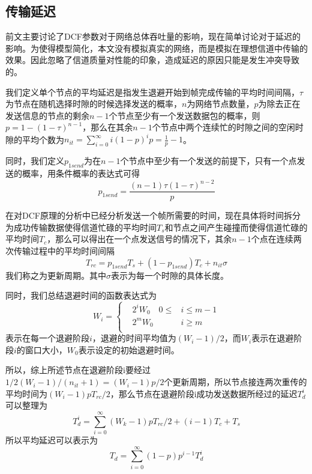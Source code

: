 \documentclass{article}
\begin{document}
\subsection{传输延迟}
前文主要讨论了DCF参数对于网络总体吞吐量的影响，现在简单讨论对于延迟的影响。为使得模型简化，本文没有模拟真实的网络，而是模拟在理想信道中传输的效果。因此忽略了信道质量对性能的印象，造成延迟的原因只能是发生冲突导致的。

我们定义单个节点的平均延迟是指发生退避开始到帧完成传输的平均时间间隔，$\tau$为节点在随机选择时隙的时候选择发送的概率，$n$为网络节点数量，$p$为除去正在发送信息的节点的剩余$n-1$个节点至少有一个发送数据包的概率，则$p=1-(1-\tau )^{n-1}$，那么在其余$n-1$个节点中两个连续忙的时隙之间的空闲时隙的平均个数为$n_{it}=\sum_{i=0}^{\infty}{i(1-p)^{i}p}=\frac{1}{p}-1$。

同时，我们定义$p_{1send}$为在$n-1$个节点中至少有一个发送的前提下，只有一个点发送的概率，用条件概率的表达式可得
\begin{equation}
p_{1send}=\frac{(n-1)\tau(1-\tau)^{n-2}}{p}
\end{equation}

在对DCF原理的分析中已经分析发送一个帧所需要的时间，现在具体将时间拆分为成功传输数据使得信道忙碌的平均时间$T_{s}$和节点之间产生碰撞而使得信道忙碌的平均时间$T_{c}$，那么可以得出在一个点发送信号的情况下，其余$n-1$个点在连续两次传输过程中的平均时间间隔
\begin{equation}
T_{rc}=p_{1send}T_{s}+(1-p_{1send})T_{c}+n_{it}\sigma
\end{equation}
我们称之为更新周期。其中$\sigma$表示为每一个时隙的具体长度。

同时，我们总结退避时间的函数表达式为
\begin{equation}
W_{i}=
\left\{
\begin{aligned}
&2^iW_{0}\quad 
0\leqslant &i\leqslant m-1\\
&2^mW_{0}\quad 			  &i\geqslant m\\
\end{aligned}
\right.
\end{equation}
表示在每一个退避阶段$i$，退避的时间平均值为$(W_{i}-1)/2$，而$W_{i}$表示在退避阶段$i$的窗口大小，$W_{0}$表示设定的初始退避时间。

所以，综上所述节点在退避阶段i要经过$1/2(W_{i}-1)/(n_{it}+1)=(W_{i}-1)p/2$个更新周期，所以节点接连两次重传的平均时间为$(W_{i}-1)pT_{rc}/2$，那么节点在退避阶段i成功发送数据所经过的延迟$T_{d}^{i}$可以整理为
\begin{equation}
T_{d}^{i}=\sum_{i=0}^{\infty}(W_{k}-1)pT_{rc}/2+(i-1)T_{c}+T_{s}
\end{equation}
所以平均延迟可以表示为
\begin{equation}
T_{d}=\sum_{i=0}^{\infty}(1-p)p^{i-1}T_{d}^{i}
\end{equation}
\end{document}
